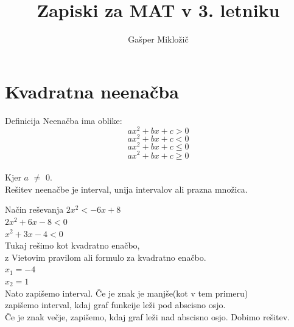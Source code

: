 \documentclass{article}
\title{Zapiski za MAT v 3. letniku}
\author{Gašper Mikložič}
\date{}
\begin{document}
\maketitle

\section{Kvadratna neenačba}

\begin{minipage}[t]{0.45\textwidth}
\vspace{0pt}
\begin{defbox}[equal height group=neenacba]{Definicija}
    \centering \large
    Neenačba ima oblike:
    $$ ax^2 + bx + c > 0 $$
    $$ ax^2 + bx + c < 0 $$
    $$ ax^2 + bx + c \leq 0 $$
    $$ ax^2 + bx + c \geq 0 $$ \\
    Kjer $a$ $\neq$ 0.\\ 
    Rešitev neenačbe je interval, unija intervalov ali prazna množica.
\end{defbox}
\end{minipage}
\hfill
\begin{minipage}[t]{0.45\textwidth}
\vspace{0pt}
\begin{zgledbox}[equal height group=neenacba]{Način reševanja}
    \centering
    $2x^2 < -6x + 8$\\
    $2x^2 +6x -8 < 0$\\
    $x^2 + 3x - 4 < 0$\\
    Tukaj rešimo kot kvadratno enačbo,\\ z Vietovim pravilom ali formulo za kvadratno enačbo.\\
    $x_1=-4$\\
    $x_2=1$\\
    Nato zapišemo interval. Če je znak je manjše(kot v tem primeru)\\ zapišemo interval, kdaj graf funkcije leži pod abscisno osjo.\\ Če je znak večje, zapišemo, kdaj graf leži nad abscisno osjo. Dobimo rešitev.\\[1mm]
    \large {}
\end{zgledbox}
\end{minipage}
\end{document}
